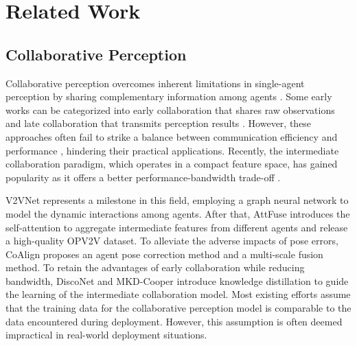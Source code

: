 \section{Related Work}
\subsection{Collaborative Perception}
Collaborative perception overcomes inherent limitations in single-agent perception by sharing complementary information among agents \cite{Han2023CollaborativePI}. Some early works can be categorized into early collaboration that shares raw observations \cite{Zhang2021EMPEM, Luo2023EdgeCooperNC} and late collaboration that transmits perception results \cite{ Miller2020CooperativePA}. However, these approaches often fail to strike a balance between communication efficiency and performance \cite{li2021learning}, hindering their practical applications. Recently, the intermediate collaboration paradigm, which operates in a compact feature space, has gained popularity as it offers a better performance-bandwidth trade-off \cite{Han2023CollaborativePI}.

V2VNet \cite{Wang2020V2VNetVC} represents a milestone in this field, employing a graph neural network to model the dynamic interactions among agents. After that, AttFuse \cite{Xu2021OPV2VAO} introduces the self-attention to aggregate intermediate features from different agents and release a high-quality OPV2V dataset. To alleviate the adverse impacts of pose errors, CoAlign \cite{Lu2022RobustC3} proposes an agent pose correction method and a multi-scale fusion method. To retain the advantages of early collaboration while reducing bandwidth, DiscoNet \cite{li2021learning} and MKD-Cooper \cite{li2023mkd} introduce knowledge distillation to guide the learning of the intermediate collaboration model. Most existing efforts assume that the training data for the collaborative perception model is comparable to the data encountered during deployment. However, this assumption is often deemed impractical in real-world deployment situations.

